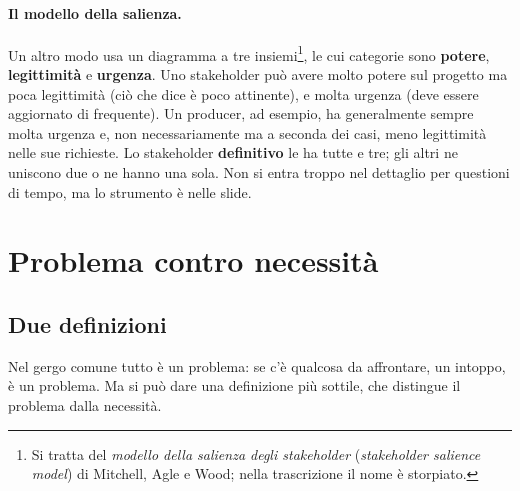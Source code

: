 \paragraph{Il modello della salienza.} Un altro modo usa un diagramma a tre
insiemi\footnote{Si tratta del \emph{modello della salienza degli
stakeholder} (\emph{stakeholder salience model}) di Mitchell, Agle e Wood; nella
trascrizione il nome è storpiato.}, le cui categorie sono \textbf{potere},
\textbf{legittimità} e \textbf{urgenza}. Uno stakeholder può avere molto
potere sul progetto ma poca legittimità (ciò che dice è poco attinente), e
molta urgenza (deve essere aggiornato di frequente). Un producer, ad esempio,
ha generalmente sempre molta urgenza e, non necessariamente ma a seconda dei
casi, meno legittimità nelle sue richieste. Lo stakeholder
\textbf{definitivo} le ha tutte e tre; gli altri ne uniscono due o ne hanno
una sola. Non si entra troppo nel dettaglio per questioni di tempo, ma lo
strumento è nelle slide.

\section{Problema contro necessità}
\label{sec:problema-necessita}



\subsection{Due definizioni}

Nel gergo comune tutto è un problema: se c'è qualcosa da affrontare, un
intoppo, è un problema. Ma si può dare una definizione più sottile, che
distingue il problema dalla necessità.

